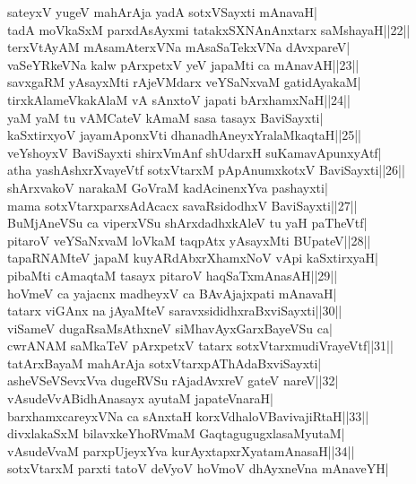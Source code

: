 \documentclass{article}
\begin{document}
sateyxV yugeV mahArAja yadA sotxVSayxti mAnavaH|\\
tadA moVkaSxM parxdAsAyxmi tatakxSXNAnAnxtarx saMshayaH||22||\\
terxVtAyAM mAsamAterxVNa mAsaSaTekxVNa dAvxpareV|\\
vaSeYRkeVNa kalw pArxpetxV yeV japaMti ca mAnavAH||23||\\
savxgaRM yAsayxMti rAjeVMdarx veYSaNxvaM gatidAyakaM|\\
tirxkAlameVkakAlaM vA sAnxtoV japati bArxhamxNaH||24||\\
yaM yaM tu vAMCateV kAmaM sasa tasayx BaviSayxti|\\
kaSxtirxyoV jayamAponxVti dhanadhAneyxYralaMkaqtaH||25||\\
veYshoyxV BaviSayxti shirxVmAnf shUdarxH suKamavApunxyAtf|\\
atha yashAshxrXvayeVtf sotxVtarxM pApAnumxkotxV BaviSayxti||26||\\
shArxvakoV narakaM GoVraM kadAcinenxYva pashayxti|\\
mama sotxVtarxparxsAdAcacx savaRsidodhxV BaviSayxti||27||\\
BuMjAneVSu ca viperxVSu shArxdadhxkAleV tu yaH paTheVtf|\\
pitaroV veYSaNxvaM loVkaM taqpAtx yAsayxMti BUpateV||28||\\
tapaRNAMteV japaM kuyARdAbxrXhamxNoV vApi kaSxtirxyaH|\\
pibaMti cAmaqtaM tasayx pitaroV haqSaTxmAnasAH||29||\\
hoVmeV ca yajacnx madheyxV ca BAvAjajxpati mAnavaH|\\
tatarx viGAnx na jAyaMteV saravxsididhxraBxviSayxti||30||\\
viSameV dugaRsaMsAthxneV siMhavAyxGarxBayeVSu ca|\\
cwrANAM saMkaTeV pArxpetxV tatarx sotxVtarxmudiVrayeVtf||31||\\
tatArxBayaM mahArAja sotxVtarxpAThAdaBxviSayxti|\\
asheVSeVSevxVva dugeRVSu rAjadAvxreV gateV nareV||32|\\
vAsudeVvABidhAnasayx ayutaM japateVnaraH|\\
barxhamxcareyxVNa ca sAnxtaH korxVdhaloVBavivajiRtaH||33||\\
divxlakaSxM bilavxkeYhoRVmaM GaqtagugugxlasaMyutaM|\\
vAsudeVvaM parxpUjeyxYva kurAyxtapxrXyatamAnasaH||34||\\
sotxVtarxM parxti tatoV deVyoV hoVmoV dhAyxneVna mAnaveYH|\\
\end{document}
